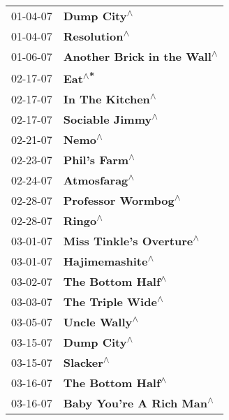 \begin{supertabular}{p{0.25\columnwidth}p{0.75\columnwidth}}
 01-04-07 &                           \textbf{Dump City\textsuperscript{$\wedge$}} \\
 01-04-07 &                          \textbf{Resolution\textsuperscript{$\wedge$}} \\
 01-06-07 &           \textbf{Another Brick in the Wall\textsuperscript{$\wedge$}} \\
 02-17-07 &                                \textbf{Eat\textsuperscript{$\wedge$*}} \\
 02-17-07 &                      \textbf{In The Kitchen\textsuperscript{$\wedge$}} \\
 02-17-07 &                      \textbf{Sociable Jimmy\textsuperscript{$\wedge$}} \\
 02-21-07 &                                \textbf{Nemo\textsuperscript{$\wedge$}} \\
 02-23-07 &                         \textbf{Phil's Farm\textsuperscript{$\wedge$}} \\
 02-24-07 &                          \textbf{Atmosfarag\textsuperscript{$\wedge$}} \\
 02-28-07 &                   \textbf{Professor Wormbog\textsuperscript{$\wedge$}} \\
 02-28-07 &                               \textbf{Ringo\textsuperscript{$\wedge$}} \\
 03-01-07 &              \textbf{Miss Tinkle's Overture\textsuperscript{$\wedge$}} \\
 03-01-07 &                       \textbf{Hajimemashite\textsuperscript{$\wedge$}} \\
 03-02-07 &                     \textbf{The Bottom Half\textsuperscript{$\wedge$}} \\
 03-03-07 &                     \textbf{The Triple Wide\textsuperscript{$\wedge$}} \\
 03-05-07 &                         \textbf{Uncle Wally\textsuperscript{$\wedge$}} \\
 03-15-07 &                           \textbf{Dump City\textsuperscript{$\wedge$}} \\
 03-15-07 &                             \textbf{Slacker\textsuperscript{$\wedge$}} \\
 03-16-07 &                     \textbf{The Bottom Half\textsuperscript{$\wedge$}} \\
 03-16-07 &              \textbf{Baby You're A Rich Man\textsuperscript{$\wedge$}} \\

\end{supertabular}
